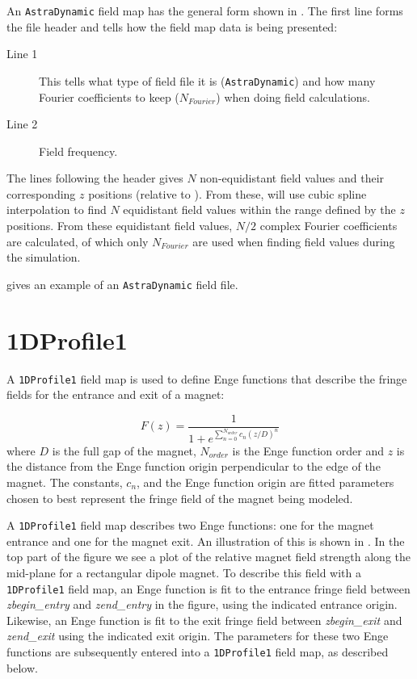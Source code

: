 An \texttt{AstraDynamic} field map has the general form shown in . The first line forms
the file header and tells \opalt how the field map data is being presented:

\begin{description}
\item[Line 1] This tells \opalt what type of field file it is (\texttt{AstraDynamic}) and how many Fourier coefficients to
  keep ($N_{Fourier}$) when doing field calculations.
\item[Line 2] Field frequency.
\end{description}

The lines following the header gives $N$ non-equidistant field values and their corresponding $z$ positions (relative
to ). From these, \opalt will use cubic spline interpolation to find $N$ equidistant field values
within the range defined by the $z$ positions. From these equidistant field values, $N/2$ complex Fourier coefficients
are calculated, of which only $N_{Fourier}$ are used when finding field values during the simulation.

 gives an example of an \texttt{AstraDynamic} field file.

\clearpage


\section{1DProfile1}
\label{sec:1DProfile1}
A \texttt{1DProfile1} field map is used to define Enge functions \cite{enge} that describe the fringe fields for the entrance and exit of a magnet:

\begin{equation*}
  F(z) = \frac{1}{1 + e^{\sum\limits_{n=0}^{N_{order}} c_{n} (z/D)^{n}}}
\end{equation*}
where $D$ is the full gap of the magnet, $N_{order}$ is the Enge function order and $z$ is the distance from the Enge function origin perpendicular to the edge of the magnet. The constants, $c_n$, and the Enge function origin are fitted parameters chosen to best represent the fringe field of the magnet being modeled.

A \texttt{1DProfile1} field map describes two Enge functions: one for the magnet entrance and one for the magnet exit. An illustration of this is shown in . In the top part of the figure we see a plot of the relative magnet field strength along the mid-plane for a rectangular dipole magnet. To describe this field with a \texttt{1DProfile1} field map, an Enge function is fit to the entrance fringe field between \emph{zbegin\_entry} and \emph{zend\_entry} in the figure, using the indicated entrance origin. Likewise, an Enge function is fit to the exit fringe field between \emph{zbegin\_exit} and \emph{zend\_exit} using the indicated exit origin. The parameters for these two Enge functions are subsequently entered into a \texttt{1DProfile1} field map, as described below.

